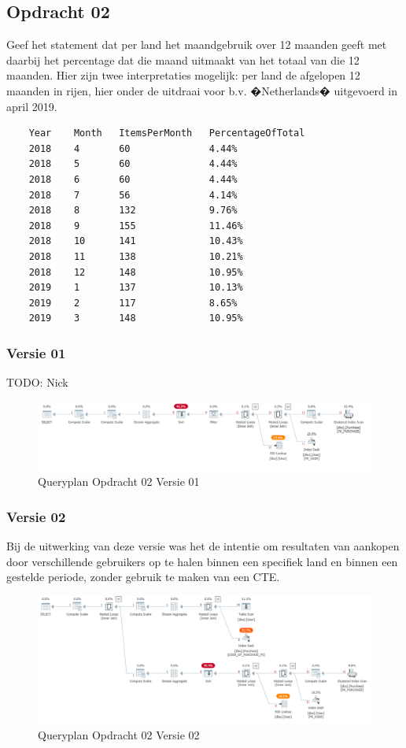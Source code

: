 \subsection{Opdracht 02}
Geef het statement dat per land het maandgebruik over 12 maanden geeft met daarbij het percentage dat die maand uitmaakt van het totaal van die 12 maanden.
Hier zijn twee interpretaties mogelijk: per land de afgelopen 12 maanden in rijen, hier onder de uitdraai voor b.v. �Netherlands� uitgevoerd in april 2019.

\begin{lstlisting}
    Year	Month	ItemsPerMonth	PercentageOfTotal
    2018	4	    60		        4.44%
    2018	5	    60		        4.44%
    2018	6	    60		        4.44%
    2018	7	    56		        4.14%
    2018	8	    132		        9.76%
    2018	9	    155		        11.46%
    2018	10	    141		        10.43%
    2018	11	    138		        10.21%
    2018	12	    148		        10.95%
    2019	1	    137		        10.13%
    2019	2	    117		        8.65%
    2019	3	    148		        10.95%
\end{lstlisting}

\subsubsection{Versie 01}
TODO: Nick

\begin{figure}[H]
    \centering
    \includegraphics[width=1\textwidth]{image/nick/opdracht-02a.PNG}
    \caption{Queryplan Opdracht 02 Versie 01}
\end{figure}

\subsubsection{Versie 02}

Bij de uitwerking van deze versie was het de intentie om resultaten van aankopen door verschillende gebruikers
op te halen binnen een specifiek land en binnen een gestelde periode, zonder gebruik te maken van een CTE.


\begin{figure}[H]
    \centering
    \includegraphics[width=1\textwidth]{image/marc/opdracht-02a.PNG}
    \caption{Queryplan Opdracht 02 Versie 02}
\end{figure}

